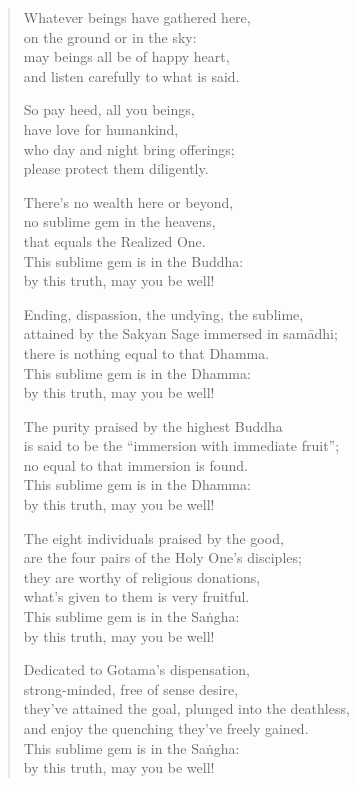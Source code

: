 \documentclass[12pt,openany]{book}%
\begin{document}
\begin{verse}%
Whatever beings have gathered here, \\
on the ground or in the sky: \\
may beings all be of happy heart, \\
and listen carefully to what is said. 

So pay heed, all you beings, \\
have love for humankind, \\
who day and night bring offerings; \\
please protect them diligently. 

There’s no wealth here or beyond, \\
no sublime gem in the heavens, \\
that equals the Realized One. \\
This sublime gem is in the Buddha: \\
by this truth, may you be well! 

Ending, dispassion, the undying, the sublime, \\
attained by the Sakyan Sage immersed in \textsanskrit{samādhi}; \\
there is nothing equal to that Dhamma. \\
This sublime gem is in the Dhamma: \\
by this truth, may you be well! 

The purity praised by the highest Buddha \\
is said to be the “immersion with immediate fruit”; \\
no equal to that immersion is found. \\
This sublime gem is in the Dhamma: \\
by this truth, may you be well! 

The eight individuals praised by the good, \\
are the four pairs of the Holy One’s disciples; \\
they are worthy of religious donations, \\
what’s given to them is very fruitful. \\
This sublime gem is in the \textsanskrit{Saṅgha}: \\
by this truth, may you be well! 

Dedicated to Gotama’s dispensation, \\
strong-minded, free of sense desire, \\
they’ve attained the goal, plunged into the deathless, \\
and enjoy the quenching they’ve freely gained. \\
This sublime gem is in the \textsanskrit{Saṅgha}: \\
by this truth, may you be well! 


\end{verse}
\end{document}
